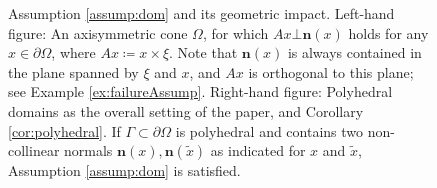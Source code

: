 \documentclass[reqno,a4paper]{amsart}
\def\vec#1{\boldsymbol{#1}}
\def\bn{\vec{n}}
\begin{document}
\begin{figure}[t]
		\caption{Assumption \ref{assump:dom} and its geometric impact. 
			Left-hand figure: An axisymmetric cone $\Omega$, for which $Ax\bot \bn(x)$ holds for any $x\in\partial\Omega$, where $Ax\coloneqq x\times\xi$. Note that $\bn(x)$ is always contained in the plane spanned by $\xi$ and $x$, and $Ax$ is orthogonal to this plane; see Example \ref{ex:failureAssump}. Right-hand figure: Polyhedral domains as the overall setting of the paper, and Corollary \ref{cor:polyhedral}. If $\Gamma\subset\partial\Omega$ is polyhedral and contains two non-collinear normals $\bn(x),\bn(\widetilde{x})$ as indicated for $x$ and $\widetilde{x}$, Assumption \ref{assump:dom} is satisfied.}\label{fig:Korno}
	\end{figure}
\end{document}
